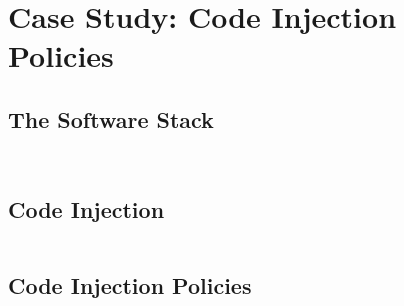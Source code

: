 \inputminted[gobble=2,firstline=427,lastline=442]{coq}{Listings/SpecCert.v}

\inputminted[gobble=2,firstline=470,lastline=510]{coq}{Listings/SpecCert.v}

\inputminted[gobble=2,firstline=512,lastline=535]{coq}{Listings/SpecCert.v}

\section{Case Study: Code Injection Policies}

\subsection{The Software Stack}

\inputminted[gobble=2,firstline=261,lastline=268]{coq}{Listings/SpecCert.v}

\inputminted[gobble=2,firstline=270,lastline=271]{coq}{Listings/SpecCert.v}

\subsection{Code Injection}

\inputminted[gobble=2,firstline=337,lastline=343]{coq}{Listings/SpecCert.v}

\subsection{Code Injection Policies}

\inputminted[gobble=2,firstline=273,lastline=280]{coq}{Listings/SpecCert.v}

\inputminted[gobble=2,firstline=345,lastline=351]{coq}{Listings/SpecCert.v}

\inputminted[gobble=2,firstline=537,lastline=543]{coq}{Listings/SpecCert.v}

\inputminted[gobble=2,firstline=545,lastline=552]{coq}{Listings/SpecCert.v}

\inputminted[gobble=2,firstline=554,lastline=582]{coq}{Listings/SpecCert.v}